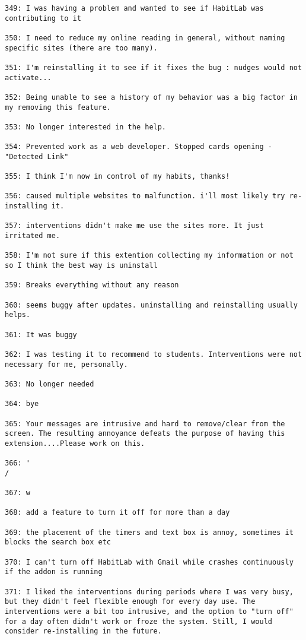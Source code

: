 \begin{lstlisting}[breaklines]
349: I was having a problem and wanted to see if HabitLab was contributing to it

350: I need to reduce my online reading in general, without naming specific sites (there are too many).

351: I'm reinstalling it to see if it fixes the bug : nudges would not activate...

352: Being unable to see a history of my behavior was a big factor in my removing this feature.

353: No longer interested in the help.

354: Prevented work as a web developer. Stopped cards opening - "Detected Link"

355: I think I'm now in control of my habits, thanks!

356: caused multiple websites to malfunction. i'll most likely try re-installing it.

357: interventions didn't make me use the sites more. It just irritated me.

358: I'm not sure if this extention collecting my information or not so I think the best way is uninstall

359: Breaks everything without any reason

360: seems buggy after updates. uninstalling and reinstalling usually helps.

361: It was buggy

362: I was testing it to recommend to students. Interventions were not necessary for me, personally.

363: No longer needed

364: bye

365: Your messages are intrusive and hard to remove/clear from the screen. The resulting annoyance defeats the purpose of having this extension....Please work on this.

366: '
/

367: w

368: add a feature to turn it off for more than a day

369: the placement of the timers and text box is annoy, sometimes it blocks the search box etc

370: I can't turn off HabitLab with Gmail while crashes continuously if the addon is running

371: I liked the interventions during periods where I was very busy, but they didn't feel flexible enough for every day use. The interventions were a bit too intrusive, and the option to "turn off" for a day often didn't work or froze the system. Still, I would consider re-installing in the future.


\end{lstlisting}
